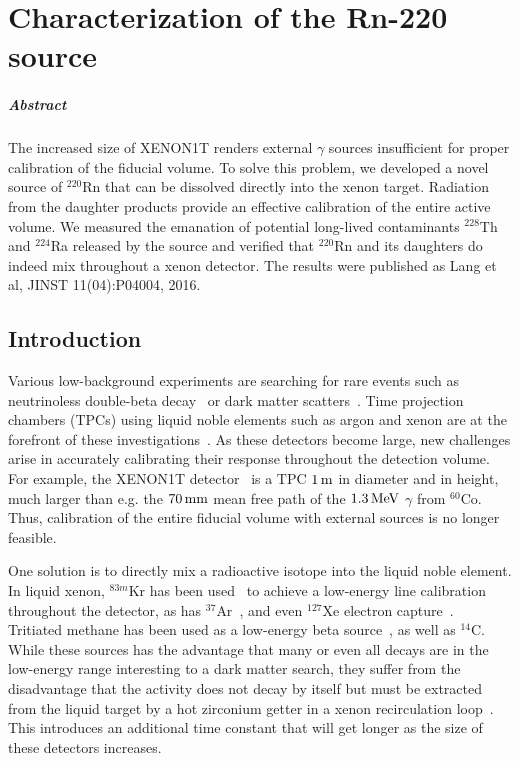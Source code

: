 
\chapter{Characterization of the Rn-220 source}\label{ch:rn220}

\paragraph{Abstract} The increased size of XENON1T renders external $\gamma$ sources insufficient for proper calibration of the fiducial volume. To solve this problem, we developed a novel source of $^{220}$Rn that can be dissolved directly into the xenon target. Radiation from the daughter products provide an effective calibration of the entire active volume. We measured the emanation of potential long-lived contaminants $^{228}$Th and $^{224}$Ra released by the source and verified that $^{220}$Rn and its daughters do indeed mix throughout a xenon detector. The results were published as Lang et al, JINST 11(04):P04004, 2016.

\section{Introduction}

Various low-background experiments are searching for rare events such as neutrinoless double-beta decay~\cite{Pandola:2014naa} or dark matter scatters~\cite{Undagoitia:2015gya}. Time projection chambers (TPCs) using liquid noble elements such as argon and xenon are at the forefront of these investigations~\cite{Albert:2015eem,Aprile:2015uzo,Akerib:2015rjg,Amaudruz:2014nsa,Calvo:2015uln,Agnes:2015ftt}. As these detectors become large, new challenges arise in accurately calibrating their response throughout the detection volume. For example, the XENON1T detector~\cite{Aprile:2015uzo} is a TPC $1\,\mathrm{m}$ in diameter and in height, much larger than e.g. the $70\,\mathrm{mm}$ mean free path of the $1.3\,\mathrm{MeV}$ $\gamma$ from $^{60}$Co. Thus, calibration of the entire fiducial volume with external sources is no longer feasible.

One solution is to directly mix a radioactive isotope into the liquid noble element. In liquid xenon, $^{83m}$Kr has been used~\cite{Akerib:2017eql} to achieve a low-energy line calibration throughout the detector, as has $^{37}$Ar~\cite{Boulton:2017hub}, and even $^{127}$Xe electron capture~\cite{Akerib:2017hph}. Tritiated methane has been used as a low-energy beta source~\cite{Akerib:2015wdi}, as well as $^{14}$C. While these sources has the advantage that many or even all decays are in the low-energy range interesting to a dark matter search, they suffer from the disadvantage that the activity does not decay by itself but must be extracted from the liquid target by a hot zirconium getter in a xenon recirculation loop~\cite{Akerib:2015wdi}. This introduces an additional time constant that will get longer as the size of these detectors increases.

